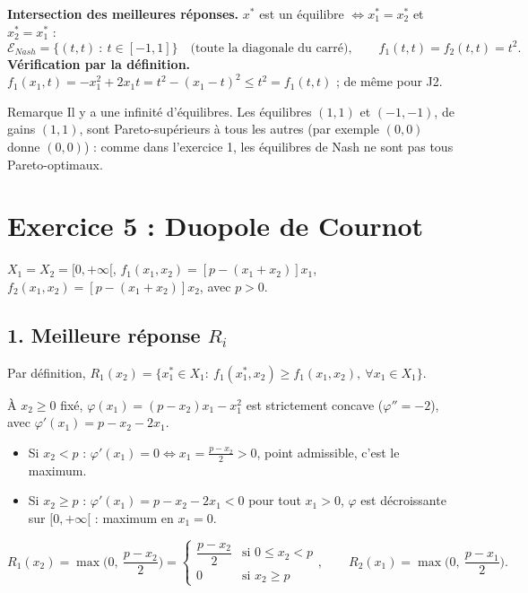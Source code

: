 \documentclass[11pt,a4paper]{article}
\begin{document}
\textbf{Intersection des meilleures réponses.} $x^*$ est un équilibre $\iff x_1^*=x_2^*$ et $x_2^*=x_1^*$ :
\[
\boxed{\mathcal{E}_{Nash}=\{(t,t)\ :\ t\in[-1,1]\}\quad\text{(toute la diagonale du carré)},\qquad f_1(t,t)=f_2(t,t)=t^2.}
\]
\textbf{Vérification par la définition.} $f_1(x_1,t)=-x_1^2+2x_1t=t^2-(x_1-t)^2\le t^2=f_1(t,t)$ ; de même pour J2. \checkmark
\begin{rembox}{Remarque}
Il y a une infinité d'équilibres. Les équilibres $(1,1)$ et $(-1,-1)$, de gains $(1,1)$, sont Pareto-supérieurs à tous les autres (par exemple $(0,0)$ donne $(0,0)$) : comme dans l'exercice 1, les équilibres de Nash ne sont pas tous Pareto-optimaux.
\end{rembox}

\section*{Exercice 5 : Duopole de Cournot}
$X_1=X_2=[0,+\infty[$, $f_1(x_1,x_2)=[p-(x_1+x_2)]x_1$, $f_2(x_1,x_2)=[p-(x_1+x_2)]x_2$, avec $p>0$.

\subsection*{1. Meilleure réponse $R_i$}
Par définition, $R_1(x_2)=\{x_1^*\in X_1:\ f_1(x_1^*,x_2)\ge f_1(x_1,x_2),\ \forall x_1\in X_1\}$.

À $x_2\ge0$ fixé, $\varphi(x_1)=(p-x_2)x_1-x_1^2$ est strictement concave ($\varphi''=-2$), avec $\varphi'(x_1)=p-x_2-2x_1$.
\begin{itemize}
\item Si $x_2<p$ : $\varphi'(x_1)=0\iff x_1=\frac{p-x_2}{2}>0$, point admissible, c'est le maximum.
\item Si $x_2\ge p$ : $\varphi'(x_1)=p-x_2-2x_1<0$ pour tout $x_1>0$, $\varphi$ est décroissante sur $[0,+\infty[$ : maximum en $x_1=0$.
\end{itemize}
\[
\boxed{R_1(x_2)=\max\Big(0,\ \frac{p-x_2}{2}\Big)=\begin{cases}\dfrac{p-x_2}{2} & \text{si } 0\le x_2< p\\[2mm] 0 & \text{si } x_2\ge p\end{cases},\qquad R_2(x_1)=\max\Big(0,\ \frac{p-x_1}{2}\Big).}
\]
\end{document}
